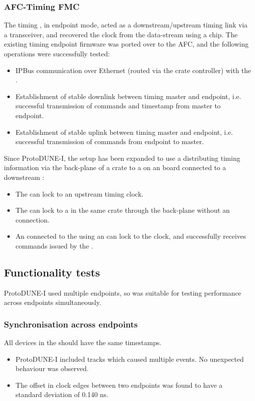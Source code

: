 \documentclass{dune}
\begin{document}
\subsubsection{AFC-Timing FMC}
The timing , in endpoint mode, acted as a downstream/upstream timing link via a  transceiver, and recovered the clock from the data-stream using a  chip.
The existing timing endpoint firmware was ported over to the AFC, and the following operations were successfully tested:
\begin{itemize}
    \item IPBus communication over Ethernet (routed via the crate controller) with the  .
    \item Establishment of stable downlink between timing master and endpoint, i.e. successful transmission of commands and timestamp from master to endpoint.
    \item Establishment of stable uplink between timing master and endpoint, i.e. successful transmission of commands from endpoint to master.
\end{itemize}
Since ProtoDUNE-I, the setup has been expanded to use a  distributing timing information via the back-plane of a  crate to a  on an  board connected to a downstream :
\begin{itemize}
    \item The  can lock to an upstream timing clock.
    \item The  can lock to a  in the same crate through the back-plane without an  connection.
    \item An  connected to the  using an  can lock to the clock, and successfully receives commands issued by the .
\end{itemize}

\subsection{Functionality tests}
ProtoDUNE-I used multiple endpoints, so was suitable for testing performance across endpoints simultaneously.
\subsubsection{Synchronisation across endpoints}
All devices in the  should have the same timestamps.
\begin{itemize}
  \item ProtoDUNE-I included tracks which caused multiple  events.
    No unexpected behaviour was observed.
  \item The offset in clock edges between two endpoints was found to have a standard deviation of 0.140 ns.
\end{itemize}
\end{document}
